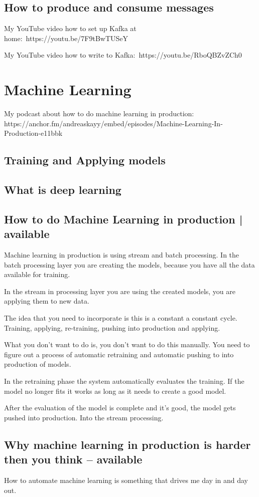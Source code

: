 \documentclass[12pt, numbers=noenddot]{scrreprt} %
\begin{document}
\section{How to produce and consume messages}

My YouTube video how to set up Kafka at home: https://youtu.be/7F9tBwTUSeY

My YouTube video how to write to Kafka: https://youtu.be/RboQBZvZCh0

\chapter{Machine Learning}
My podcast about how to do machine learning in production: https://anchor.fm/andreaskayy/embed/episodes/Machine-Learning-In-Production-e11bbk

\section{Training and Applying models}
\section{What is deep learning}
\section{How to do Machine Learning in production | available}
Machine learning in production is using stream and batch processing. In the batch processing layer you are creating the models, because you have all the data available for training.

In the stream in processing layer you are using the created models, you are applying them to new data.

The idea that you need to incorporate is this is a constant a constant cycle. Training, applying, re-training, pushing into production and applying.

What you don’t want to do is, you don’t want to do this manually. You need to figure out a process of automatic retraining and automatic pushing to into production of models.

In the retraining phase the system automatically evaluates the training. If the model no longer fits it works as long as it needs to create a good model.

After the evaluation of the model is complete and it’s good, the model gets pushed into production. Into the stream processing.

\section{Why machine learning in production is harder then you think -- available}
How to automate machine learning is something that drives me day in and day out.
\end{document}
